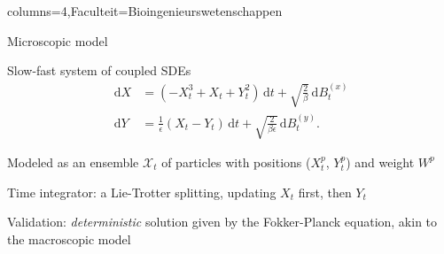 \documentclass[landscape,a0paper,fontscale=0.45]{kuleuvenposter}
\newcommand{\dd}{\,\mathrm{d}}
\begin{document}
\begin{poster}{columns=4,Faculteit=Bioingenieurswetenschappen}
\begin{posterbox}[name=microscopic, column=0,below=micro-macro modelling]{Microscopic model}
\begin{noindentitemize}
\item Slow-fast system of coupled SDEs
\begin{align}
\dd X &= (-X_t^3 + X_t + Y_t^2) \dd t + \sqrt{\frac{2}{\beta}} \dd B_t^{(x)}  \label{eq:xParisdyn}\\
\dd Y &= \frac{1}{\epsilon}(X_t - Y_t) \dd t + \sqrt{\frac{2}{\beta\epsilon}} \dd B_t^{(y)}. \label{eq:yParisdyn}
\end{align}
%
\item Modeled as an ensemble $\mathcal{X}_t$ of particles with positions ($X_t^p$, $Y_t^p$) and weight $W^p$
\item Time integrator: a Lie-Trotter splitting, updating $X_t$ first, then $Y_t$
\item Validation: \emph{deterministic} solution given by the Fokker-Planck equation, akin to the macroscopic model
\end{noindentitemize}
\end{posterbox}


\end{poster}
\end{document}

